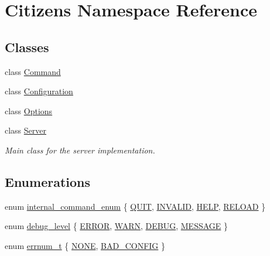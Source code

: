 \hypertarget{namespaceCitizens}{
\section{Citizens Namespace Reference}
\label{namespaceCitizens}
}
\subsection*{Classes}
\begin{DoxyCompactItemize}
\item 
class \hyperlink{classCitizens_1_1Command}{Command}
\item 
class \hyperlink{classCitizens_1_1Configuration}{Configuration}
\item 
class \hyperlink{classCitizens_1_1Options}{Options}
\item 
class \hyperlink{classCitizens_1_1Server}{Server}
\begin{DoxyCompactList}\small\item\em Main class for the server implementation. \end{DoxyCompactList}\end{DoxyCompactItemize}
\subsection*{Enumerations}
\begin{DoxyCompactItemize}
\item 
enum \hyperlink{namespaceCitizens_afc519f105f4211d23cc3c1e047cd9463}{internal\_\-command\_\-enum} \{ \hyperlink{namespaceCitizens_afc519f105f4211d23cc3c1e047cd9463a3a0bdaf9900879155760b2ef38b6bac0}{QUIT}, 
\hyperlink{namespaceCitizens_afc519f105f4211d23cc3c1e047cd9463aaa763081c1c57e4c24ee5a5db8cb366f}{INVALID}, 
\hyperlink{namespaceCitizens_afc519f105f4211d23cc3c1e047cd9463a39ee5509f4d2ee6433cb74a764d4ca19}{HELP}, 
\hyperlink{namespaceCitizens_afc519f105f4211d23cc3c1e047cd9463a7dd6c34bd3379649745f84694404e833}{RELOAD}
 \}
\item 
enum \hyperlink{namespaceCitizens_a9963b579fdb0dd7e365dbc4d3a2b7702}{debug\_\-level} \{ \hyperlink{namespaceCitizens_a9963b579fdb0dd7e365dbc4d3a2b7702accb3b56a394ff422a704af5d028971c4}{ERROR}, 
\hyperlink{namespaceCitizens_a9963b579fdb0dd7e365dbc4d3a2b7702a34cf7a477cce7c2a3da82604c07cda3a}{WARN}, 
\hyperlink{namespaceCitizens_a9963b579fdb0dd7e365dbc4d3a2b7702a02c263988933bfb82028d799cb37d143}{DEBUG}, 
\hyperlink{namespaceCitizens_a9963b579fdb0dd7e365dbc4d3a2b7702a07a1f8d853e7d38018e4a28ebfa89774}{MESSAGE}
 \}
\item 
enum \hyperlink{namespaceCitizens_a95a9f90737b76ba36a73fed89cd847b3}{errnum\_\-t} \{ \hyperlink{namespaceCitizens_a95a9f90737b76ba36a73fed89cd847b3afeb11cb7f0ce65c45087ab269f6c9bf3}{NONE}, 
\hyperlink{namespaceCitizens_a95a9f90737b76ba36a73fed89cd847b3a62c3feb2f12d4fa8c7771bd55d2658da}{BAD\_\-CONFIG}
 \}
\end{DoxyCompactItemize}


